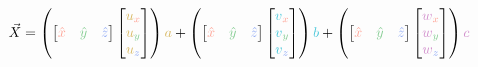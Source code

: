 \documentclass[preview]{standalone}
\begin{document}
$$\vec{X} =
\left(\begin{bmatrix}\textcolor[HTML]{fea294}{\hat{x}}&\textcolor[HTML]{81cb8f}{\hat{y}}&\textcolor[HTML]{91abf6}{\hat{z}}\end{bmatrix}\begin{bmatrix}\textcolor[HTML]{d7b760}{u}_{\textcolor[HTML]{fea294}{x}}\\\textcolor[HTML]{d7b760}{u}_{\textcolor[HTML]{81cb8f}{y}}\\\textcolor[HTML]{d7b760}{u}_{\textcolor[HTML]{91abf6}{z}}\end{bmatrix}\right)\textcolor[HTML]{d7b760}{a} +
\left(\begin{bmatrix}\textcolor[HTML]{fea294}{\hat{x}}&\textcolor[HTML]{81cb8f}{\hat{y}}&\textcolor[HTML]{91abf6}{\hat{z}}\end{bmatrix}\begin{bmatrix}\textcolor[HTML]{46c6d9}{v}_{\textcolor[HTML]{fea294}{x}}\\\textcolor[HTML]{46c6d9}{v}_{\textcolor[HTML]{81cb8f}{y}}\\\textcolor[HTML]{46c6d9}{v}_{\textcolor[HTML]{91abf6}{z}}\end{bmatrix}\right)\textcolor[HTML]{46c6d9}{b} +
\left(\begin{bmatrix}\textcolor[HTML]{fea294}{\hat{x}}&\textcolor[HTML]{81cb8f}{\hat{y}}&\textcolor[HTML]{91abf6}{\hat{z}}\end{bmatrix}\begin{bmatrix}\textcolor[HTML]{d290cd}{w}_{\textcolor[HTML]{fea294}{x}}\\\textcolor[HTML]{d290cd}{w}_{\textcolor[HTML]{81cb8f}{y}}\\\textcolor[HTML]{d290cd}{w}_{\textcolor[HTML]{91abf6}{z}}\end{bmatrix}\right)\textcolor[HTML]{d290cd}{c}$$
\end{document}
